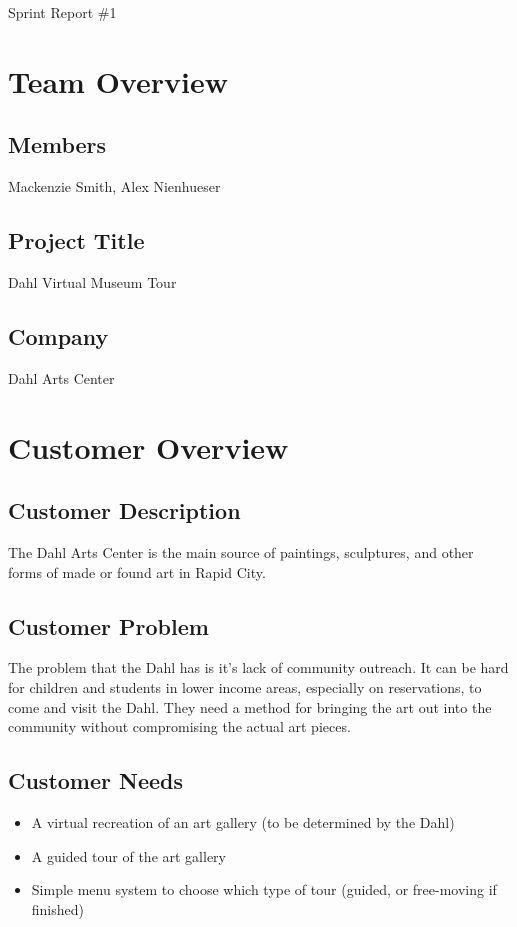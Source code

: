 \documentclass[11pt]{book}
\begin{document}
{\fontsize{16}{16}\selectfont Sprint Report \#1}

\section*{Team Overview}
\hrulefill
\subsection*{Members}
Mackenzie Smith, Alex Nienhueser

\subsection*{Project Title}
Dahl Virtual Museum Tour

\subsection*{Company}
Dahl Arts Center

\section*{Customer Overview}
\hrulefill
\subsection*{Customer Description}
The Dahl Arts Center is the main source of paintings, sculptures, and other forms of made or found art in Rapid City.

\subsection*{Customer Problem}
The problem that the Dahl has is it's lack of community outreach.  It can be hard for children and students in lower income areas, especially on reservations, to come and visit the Dahl.  They need a method for bringing the art out into the community without compromising the actual art pieces.

\subsection*{Customer Needs}
\begin{itemize}
\item A virtual recreation of an art gallery (to be determined by the Dahl)
\item A guided tour of the art gallery
\item Simple menu system to choose which type of tour (guided, or free-moving if finished)
\end{itemize}
\end{document}
